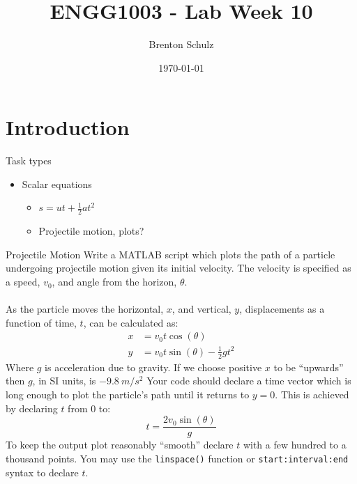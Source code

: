 \documentclass{lab}
\title{ENGG1003 - Lab Week 10}
\author{Brenton Schulz}
\date{\today}
\begin{document}
\maketitle

\section{Introduction}

Task types

\begin{itemize}
	\item Scalar equations
		\begin{itemize}
			\item $s=ut+\frac{1}{2}at^2$
			\item Projectile motion, plots?
		\end{itemize}
\end{itemize}

\begin{task}{Projectile Motion}{}
Write a MATLAB script which plots the path of a particle undergoing projectile motion given its initial velocity. The velocity is specified as a speed, $v_0$, and angle from the horizon, $\theta$.
\\~\\
As the particle moves the horizontal, $x$, and vertical, $y$, displacements as a function of time, $t$, can be calculated as:
\begin{align*}
x &= v_0 t \cos(\theta) \\
y &= v_0 t \sin(\theta) - \frac{1}{2}g t^2
\end{align*}
Where $g$ is acceleration due to gravity. If we choose positive $x$ to be ``upwards'' then $g$, in SI units, is $-9.8~{m/s^2}$
Your code should declare a time vector which is long enough to plot the particle's path until it returns to $y=0$. This is achieved by declaring $t$ from 0 to:
\begin{equation*}
t = \frac{2 v_0 \sin(\theta)}{g}
\end{equation*}
To keep the output plot reasonably ``smooth'' declare $t$ with a few hundred to a thousand points. You may use the \texttt{linspace()} function or \texttt{start:interval:end} syntax to declare $t$. 
\\~\\
\end{task}
\end{document}

